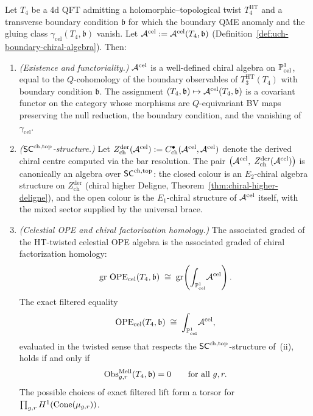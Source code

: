 \begin{theorem}
\label{thm:uch-main}
Let $T_4$ be a $4$d QFT admitting a holomorphic--topological twist
$T_4^{\mathrm{HT}}$ and a transverse boundary condition $\mathfrak b$
for which the boundary QME anomaly and the gluing class
$\gamma_{\mathrm{cel}}(T_4,\mathfrak b)$ vanish. Let
$\mathcal A^{\mathrm{cel}} := \mathcal A^{\mathrm{cel}}(T_4,\mathfrak b)$
(Definition~\ref{def:uch-boundary-chiral-algebra}). Then:
\begin{enumerate}[label=\textup{(\roman*)}]
\item \emph{(Existence and functoriality.)}
$\mathcal A^{\mathrm{cel}}$ is a well-defined chiral algebra on
$\mathbb P^1_{\text{cel}}$, equal to the $Q$-cohomology of the boundary
observables of $T_3^{\mathrm{HT}}(T_4)$ with boundary condition
$\mathfrak b$. The assignment
$(T_4,\mathfrak b)\mapsto\mathcal A^{\mathrm{cel}}(T_4,\mathfrak b)$ is a
covariant functor on the category whose morphisms are $Q$-equivariant
BV maps preserving the null reduction, the boundary condition, and the
vanishing of $\gamma_{\mathrm{cel}}$.

\item \emph{($\mathsf{SC}^{\mathrm{ch,top}}$-structure.)}
Let $Z^{\mathrm{der}}_{\mathrm{ch}}(\mathcal A^{\mathrm{cel}}) :=
C^\bullet_{\mathrm{ch}}(\mathcal A^{\mathrm{cel}},\mathcal A^{\mathrm{cel}})$ denote
the derived chiral centre computed via the bar resolution. The pair
$\bigl(\mathcal A^{\mathrm{cel}},\; Z^{\mathrm{der}}_{\mathrm{ch}}(\mathcal A^{\mathrm{cel}})\bigr)$
is canonically an algebra over $\mathsf{SC}^{\mathrm{ch,top}}$: the closed colour is an
$E_2$-chiral algebra structure on $Z^{\mathrm{der}}_{\mathrm{ch}}$
(chiral higher Deligne, Theorem~\ref{thm:chiral-higher-deligne}), and the
open colour is the $E_1$-chiral structure of $\mathcal A^{\mathrm{cel}}$
itself, with the mixed sector supplied by the universal brace.

\item \emph{(Celestial OPE and chiral factorization homology.)}
The associated graded of the HT-twisted celestial OPE algebra is the
associated graded of chiral factorization homology:
\[
\operatorname{gr}\,\mathrm{OPE}_{\text{cel}}(T_4,\mathfrak b)
\;\cong\;
\operatorname{gr}\!\left(\int_{\mathbb P^1_{\text{cel}}}\!\mathcal A^{\mathrm{cel}}\right).
\]
The exact filtered equality
\[
\mathrm{OPE}_{\text{cel}}(T_4,\mathfrak b)
\;\cong\;
\int_{\mathbb P^1_{\text{cel}}}\!\mathcal A^{\mathrm{cel}},
\]
evaluated in the twisted sense that respects the $\mathsf{SC}^{\mathrm{ch,top}}$-structure
of~\textup{(ii)}, holds if and only if
\[
\operatorname{Obs}^{\mathrm{Mell}}_{g,r}(T_4,\mathfrak b)=0
\qquad
\text{for all } g,r.
\]
The possible choices of exact filtered lift form a torsor for
\(\prod_{g,r}H^1(\operatorname{Cone}(\mu_{g,r}))\).
\end{enumerate}
\end{theorem}

